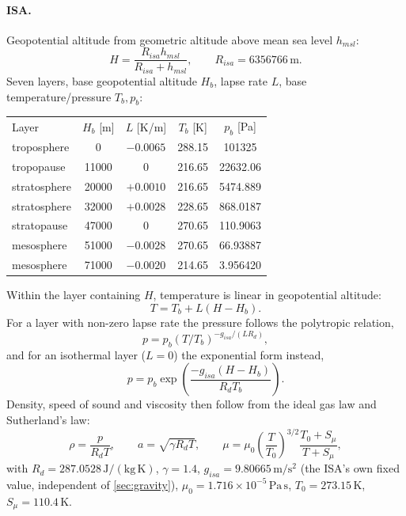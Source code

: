 \paragraph{ISA.} Geopotential altitude from geometric altitude above mean sea level $h_{msl}$:
\begin{equation}
    H = \frac{R_{isa}h_{msl}}{R_{isa}+h_{msl}}, \qquad R_{isa} = 6356766\,\mathrm{m}.
\end{equation}
Seven layers, base geopotential altitude $H_b$, lapse rate $L$, base temperature/pressure
$T_b, p_b$:
\begin{center}
\begin{tabular}{l c c c c}
Layer & $H_b$ [m] & $L$ [K/m] & $T_b$ [K] & $p_b$ [Pa] \\
troposphere  & 0     & $-0.0065$ & 288.15 & 101325   \\
tropopause   & 11000 & $0$       & 216.65 & 22632.06 \\
stratosphere & 20000 & $+0.0010$ & 216.65 & 5474.889 \\
stratosphere & 32000 & $+0.0028$ & 228.65 & 868.0187 \\
stratopause  & 47000 & $0$       & 270.65 & 110.9063 \\
mesosphere   & 51000 & $-0.0028$ & 270.65 & 66.93887 \\
mesosphere   & 71000 & $-0.0020$ & 214.65 & 3.956420 \\
\end{tabular}
\end{center}
Within the layer containing $H$, temperature is linear in geopotential altitude:
\begin{equation}
    T = T_b + L(H-H_b).
\end{equation}
For a layer with non-zero lapse rate the pressure follows the polytropic relation,
\begin{equation}
    p = p_b(T/T_b)^{-g_{isa}/(LR_d)},
\end{equation}
and for an isothermal layer ($L=0$) the exponential form instead,
\begin{equation}
    p = p_b\exp\!\left(\frac{-g_{isa}(H-H_b)}{R_dT_b}\right).
\end{equation}
Density, speed of sound and viscosity then follow from the ideal gas law and Sutherland's law:
\begin{equation}
    \rho = \frac{p}{R_dT}, \qquad a = \sqrt{\gamma R_dT}, \qquad
    \mu = \mu_0\left(\frac{T}{T_0}\right)^{3/2}\frac{T_0+S_\mu}{T+S_\mu},
\end{equation}
with $R_d = 287.0528\,\mathrm{J/(kg\,K)}$, $\gamma = 1.4$, $g_{isa} = 9.80665\,\mathrm{m/s^2}$ (the
ISA's own fixed value, independent of \autoref{sec:gravity}), $\mu_0 = 1.716\times10^{-5}\,\mathrm{Pa\,s}$,
$T_0 = 273.15\,\mathrm{K}$, $S_\mu = 110.4\,\mathrm{K}$.

